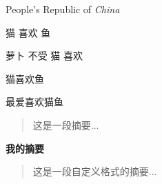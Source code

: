 \documentclass{ctexart}
\newcommand\PRC{People's Republic of \emph{China}}
\newcommand\loves[2]{#1 喜欢 #2}
\newcommand\hateby[2]{#2 不受 #1 喜欢}
\newcommand\love[3][喜欢]{#2#1#3}
\newenvironment{myabstract}[1][摘要]%
{\small
	\begin{center}\bfseries #1\end{center}
	\begin{quotation}}%
	{\end{quotation}}
\begin{document}
	\PRC 
	
	\loves{猫}{鱼} 
	
	\hateby{猫}{萝卜}
	
	\love{猫}{鱼}
	
	\love{最爱}{猫}{鱼}
	
	\begin{abstract}
	  这是一段摘要...
	\end{abstract}
	
	\begin{myabstract}[我的摘要]
		这是一段自定义格式的摘要...
	\end{myabstract}
\end{document}

